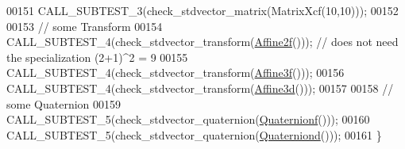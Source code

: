 \begin{DoxyCode}
00151   CALL\_SUBTEST\_3(check\_stdvector\_matrix(MatrixXcf(10,10)));
00152 
00153   \textcolor{comment}{// some Transform}
00154   CALL\_SUBTEST\_4(check\_stdvector\_transform(\hyperlink{group___geometry___module_ga2c1ea05a21899654ee3a2e3f91fa30e0}{Affine2f}())); \textcolor{comment}{// does not need the specialization
       (2+1)^2 = 9}
00155   CALL\_SUBTEST\_4(check\_stdvector\_transform(\hyperlink{group___geometry___module_ga17e901de8ff882aea7845c5457db6a4f}{Affine3f}()));
00156   CALL\_SUBTEST\_4(check\_stdvector\_transform(\hyperlink{group___geometry___module_gaaffa69d3143826efeb84e5d6c56a4c78}{Affine3d}()));
00157 
00158   \textcolor{comment}{// some Quaternion}
00159   CALL\_SUBTEST\_5(check\_stdvector\_quaternion(\hyperlink{group___geometry___module_ga785b13a5a87f9bf55d4eba51ead2dcf0}{Quaternionf}()));
00160   CALL\_SUBTEST\_5(check\_stdvector\_quaternion(\hyperlink{group___geometry___module_ga6e77eb8b6aae0e04be2db88107dbc642}{Quaterniond}()));
00161 \}
\end{DoxyCode}
